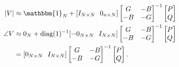 \begin{align*}
	|V| & \approx \mathbbm{1}_N + [I_{N\times N}\ \ 0_{n \times N}] \begin{bmatrix}
		G & -B\\
		-B & -G
	\end{bmatrix}^{-1}\begin{bmatrix}
	P\\Q
	\end{bmatrix}\\
	\angle V & \approx 0_{N} + \text{diag}(1)^{-1}[-0_{N \times N}\ \ I_{N \times N}]\begin{bmatrix}
	G & -B\\
	-B & -G
	\end{bmatrix}^{-1}\begin{bmatrix}
	P\\Q
	\end{bmatrix}\\
	&= [0_{N \times N}\ \ I_{N \times N}]\begin{bmatrix}
	G & -B\\
	-B & -G
	\end{bmatrix}^{-1}\begin{bmatrix}
	P\\Q
	\end{bmatrix}.
\end{align*}